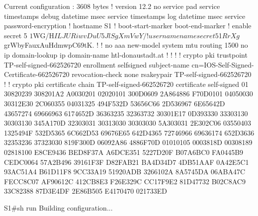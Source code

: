 \documentclass[a4paper]{article}
\begin{document}
Current configuration : 3608 bytes
!
version 12.2
no service pad
service timestamps debug datetime msec
service timestamps log datetime msec
service password-encryption
!
hostname S1
!
boot-start-marker
boot-end-marker
!
enable secret 5 $1$WG/H$ILJURiwvDuU5JlSgXmVwY/
!
username name secret 5 $1$RrXg$grWbyFauxAuHdmwpC69tK.
!
!
no aaa new-model
system mtu routing 1500
no ip domain-lookup
ip domain-name htl-donaustadt.at
!
!
!
!
crypto pki trustpoint TP-self-signed-662526720
 enrollment selfsigned
 subject-name cn=IOS-Self-Signed-Certificate-662526720
 revocation-check none
 rsakeypair TP-self-signed-662526720
!
!
crypto pki certificate chain TP-self-signed-662526720
 certificate self-signed 01
  30820239 308201A2 A0030201 02020101 300D0609 2A864886 F70D0101 04050030
  30312E30 2C060355 04031325 494F532D 53656C66 2D536967 6E65642D 43657274
  69666963 6174652D 36363235 32363732 30301E17 0D393330 33303130 30303130
  345A170D 32303031 30313030 30303030 5A303031 2E302C06 03550403 1325494F
  532D5365 6C662D53 69676E65 642D4365 72746966 69636174 652D3636 32353236
  37323030 819F300D 06092A86 4886F70D 01010105 0003818D 00308189 02818100
  E8CE9436 BED8F37A A6DCE351 5227D20F B07A6BC0 FA0445B9 CEDC0064 57A2B496
  39161F3F D82FAB21 BA4D34D7 4DB51AAF 0A42E5C1 93AC51A4 B61D11F8 9CC33A19
  51920ADB 3266102A 8A5745DA 06ABA47C FECC8C07 AF90612C 412CB8E3 F26E329C
  CC17F9E2 81D47732 B02C8AC9 33C82388 87D3E4DF 2E86B505 E4170470 021733ED

S1#sh run
Building configuration...
\end{document}
